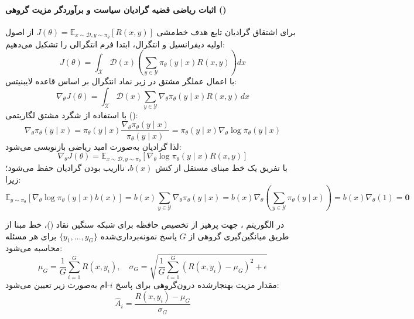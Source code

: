 \paragraph*{اثبات ریاضی قضیه گرادیان سیاست و برآوردگر مزیت گروهی ()}
برای اشتقاق گرادیان تابع هدف خط‌مشی $J(\theta) = \mathbb{E}_{x \sim \mathcal{D}, y \sim \pi_\theta}[R(x, y)]$ از اصول اولیه دیفرانسیل و انتگرال، ابتدا فرم انتگرالی را تشکیل می‌دهیم:
\begin{equation}
    J(\theta) = \int_{\mathcal{X}} \mathcal{D}(x) \left( \sum_{y \in \mathcal{Y}} \pi_\theta(y \mid x) R(x, y) \right) dx
\end{equation}
با اعمال عملگر مشتق در زیر نماد انتگرال بر اساس قاعده لایبنیتس:
\begin{equation}
    \nabla_\theta J(\theta) = \int_{\mathcal{X}} \mathcal{D}(x) \sum_{y \in \mathcal{Y}} \nabla_\theta \pi_\theta(y \mid x) R(x, y) \, dx
\end{equation}
با استفاده از شگرد مشتق لگاریتمی ():
\begin{equation}
    \nabla_\theta \pi_\theta(y \mid x) = \pi_\theta(y \mid x) \frac{\nabla_\theta \pi_\theta(y \mid x)}{\pi_\theta(y \mid x)} = \pi_\theta(y \mid x) \nabla_\theta \log \pi_\theta(y \mid x)
\end{equation}
لذا گرادیان به‌صورت امید ریاضی بازنویسی می‌شود:
\begin{equation}
    \nabla_\theta J(\theta) = \mathbb{E}_{x \sim \mathcal{D}, y \sim \pi_\theta} \left[ \nabla_\theta \log \pi_\theta(y \mid x) R(x, y) \right]
\end{equation}
با تفریق یک خط مبنای مستقل از کنش $b(x)$، نااریب بودن گرادیان حفظ می‌شود؛ زیرا:
\begin{equation}
    \mathbb{E}_{y \sim \pi_\theta} \left[ \nabla_\theta \log \pi_\theta(y \mid x) b(x) \right] = b(x) \sum_{y \in \mathcal{Y}} \nabla_\theta \pi_\theta(y \mid x) = b(x) \nabla_\theta \left( \sum_{y \in \mathcal{Y}} \pi_\theta(y \mid x) \right) = b(x) \nabla_\theta(1) = \mathbf{0}
\end{equation}

در الگوریتم  \cite{shao2024deepseekmath}، جهت پرهیز از تخصیص حافظه برای شبکه سنگین نقاد ()، خط مبنا از طریق میانگین‌گیری گروهی از $G$ پاسخ نمونه‌برداری‌شده $\{y_1, \dots, y_G\}$ برای هر مسئله محاسبه می‌شود:
\begin{equation}
    \mu_G = \frac{1}{G} \sum_{i=1}^G R(x, y_i), \quad \sigma_G = \sqrt{ \frac{1}{G} \sum_{i=1}^G (R(x, y_i) - \mu_G)^2 + \epsilon }
\end{equation}
مقدار مزیت بهنجارشده درون‌گروهی برای پاسخ $i$-ام به‌صورت زیر تعیین می‌شود:
\begin{equation}
    \hat{A}_i = \frac{R(x, y_i) - \mu_G}{\sigma_G}
\end{equation}

